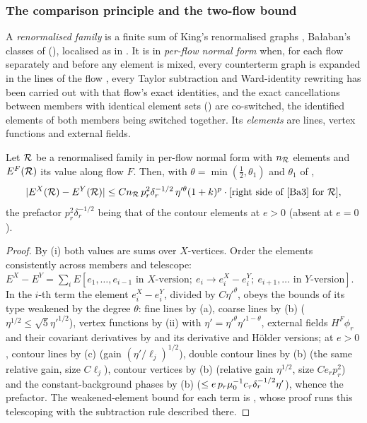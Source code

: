 
\subsubsection*{The comparison principle and the two-flow bound}

A \emph{renormalised family} is a finite sum of King's renormalised graphs \cite[\S3.5]{K1}, Ba{\l}aban's classes of \cite[\S\S2--3]{Ba3} (), localised as in \cite[(1.33)]{Ba3}. It is in \emph{per-flow normal form} when, for each flow separately and before any element is mixed, every counterterm graph is expanded in the lines of the flow \cite[(3.76)]{K1}, every Taylor subtraction \cite[(3.83)]{K1} and Ward-identity rewriting has been carried out with that flow's exact identities, and the exact cancellations between members with identical element sets (\cite[(3.6)/(3.7), (2.21b)/(2.21g), (2.18)]{Ba3}) are co-switched, the identified elements of both members being switched together. Its \emph{elements} are lines, vertex functions and external fields.

\begin{proposition}\label{rot:prop:cp}
Let $\mathcal R$ be a renormalised family in per-flow normal form with $n_{\mathcal R}$ elements and $E^F(\mathcal R)$ its value along flow $F$. Then, with $\theta=\min(\frac12,\theta_1)$ and $\theta_1$ of ,
\[
|E^X(\cR)-E^Y(\cR)|\le Cn_\cR\,p_r^2\delta_r^{-1/2}\,\eta'^{\theta}(1+k)^p\cdot[\text{right side of \cite[(1.33)]{Ba3} for }\cR],
\]
the prefactor $p_r^2\delta_r^{-1/2}$ being that of the contour elements at $e>0$ (absent at $e=0$).
\end{proposition}
\begin{proof}
By (i) both values are sums over $X$-vertices. Order the elements consistently across members and telescope: $E^X-E^Y=\sum_iE[e_1,\dots,e_{i-1}\text{ in $X$-version};\ e_i\to e_i^X-e_i^Y;\ e_{i+1},\dots\text{ in $Y$-version}]$. In the $i$-th term the element $e^X_i-e^Y_i$, divided by $C\eta'^\theta$, obeys the bounds of its type weakened by the degree $\theta$: fine lines by (a), coarse lines by (b) ($\eta^{1/2}\le\sqrt5\eta'^{1/2}$), vertex functions by (ii) with $\eta'=\eta'^\theta\eta'^{1-\theta}$, external fields $H^F\phi_r$ and their covariant derivatives by  and its derivative and H\"older versions; at $e>0$, contour lines \cite[(3.27)]{K1} by (c) (gain $(\eta'/\ell_j)^{1/2}$), double contour lines by (b) (the same relative gain, size $C\ell_j$), contour vertices \cite[(3.24)--(3.26)]{K1} by (b) (relative gain $\eta^{1/2}$, size $Ce_rp_r^2$) and the constant-background phases \cite[(3.46)]{K1} by (b) ($\le e\,p_r\mu_0^{-1}c_\tau\delta_r^{-1/2}\eta'$), whence the prefactor. The weakened-element bound for each term is , whose proof runs this telescoping with the subtraction rule described there.
\end{proof}

